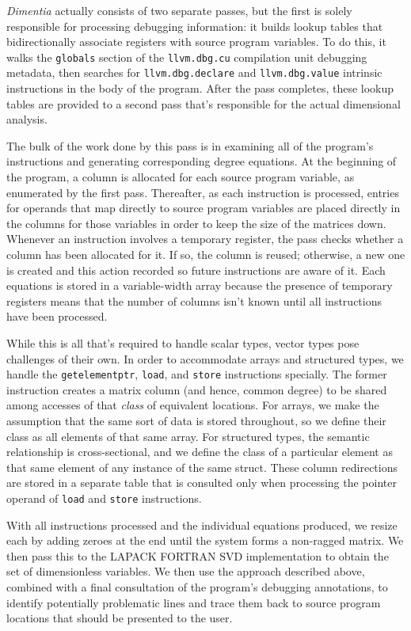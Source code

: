 \documentclass[12pt]{article}
\begin{document}
\textit{Dimentia} actually consists of two separate passes, but the first is solely responsible for processing debugging information: it builds lookup tables that bidirectionally associate registers with source program variables.
To do this, it walks the \texttt{globals} section of the \texttt{llvm.dbg.cu} compilation unit debugging metadata, then searches for \texttt{llvm.dbg.declare} and \texttt{llvm.dbg.value} intrinsic instructions in the body of the program.
After the pass completes, these lookup tables are provided to a second pass that's responsible for the actual dimensional analysis.

The bulk of the work done by this pass is in examining all of the program's instructions and generating corresponding degree equations.
At the beginning of the program, a column is allocated for each source program variable, as enumerated by the first pass.
Thereafter, as each instruction is processed, entries for operands that map directly to source program variables are placed directly in the columns for those variables in order to keep the size of the matrices down.
Whenever an instruction involves a temporary register, the pass checks whether a column has been allocated for it.
If so, the column is reused; otherwise, a new one is created and this action recorded so future instructions are aware of it.
Each equations is stored in a variable-width array because the presence of temporary registers means that the number of columns isn't known until all instructions have been processed.

While this is all that's required to handle scalar types, vector types pose challenges of their own.
In order to accommodate arrays and structured types, we handle the \texttt{getelementptr}, \texttt{load}, and \texttt{store} instructions specially.
The former instruction creates a matrix column (and hence, common degree) to be shared among accesses of that \textit{class} of equivalent locations.
For arrays, we make the assumption that the same sort of data is stored throughout, so we define their class as all elements of that same array.
For structured types, the semantic relationship is cross-sectional, and we define the class of a particular element as that same element of any instance of the same struct.
These column redirections are stored in a separate table that is consulted only when processing the pointer operand of \texttt{load} and \texttt{store} instructions.

With all instructions processed and the individual equations produced, we resize each by adding zeroes at the end until the system forms a non-ragged matrix.
We then pass this to the LAPACK FORTRAN SVD implementation to obtain the set of dimensionless variables.
We then use the approach described above, combined with a final consultation of the program's debugging annotations, to identify potentially problematic lines and trace them back to source program locations that should be presented to the user.
\end{document}
